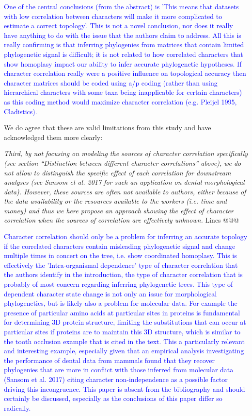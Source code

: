 \documentclass[12pt,letterpaper]{article}
\begin{document}
\textcolor{blue}{One of the central conclusions (from the abstract) is 'This means that datasets with low correlation between characters will make it more complicated to estimate a correct topology'. This is not a novel conclusion, nor does it really have anything to do with the issue that the authors claim to address. All this is really confirming is that inferring phylogenies from matrices that contain limited phylogenetic signal is difficult; it is not related to how correlated characters that show homoplasy impact our ability to infer accurate phylogenetic hypotheses. If character correlation really were a positive influence on topological accuracy then character matrices should be coded using a/p coding (rather than using hierarchical characters with some taxa being inapplicable for certain characters) as this coding method would maximize character correlation (e.g. Pleijel 1995, Cladistics).}


We do agree that these are valid limitations from this study and have acknowledged them more clearly:

\textit{Third, by not focusing on modeling the sources of character correlation specifically (see section “Distinction between different character correlations” above), we do not allow to distinguish the specific effect of each correlation for downstream analyses (see Sansom et al. 2017 for such an application on dental morphological data). However, these sources are often not available to authors, either because of the data availability or the resources available to the workers (i.e. time and money) and thus we here propose an approach showing the effect of character correlation when the sources of correlation are effectively unknown.} Lines @@@



\textcolor{blue}{Character correlation should only be a problem for inferring an accurate topology if the correlated characters contain misleading phylogenetic signal and change multiple times in concert on the tree, i.e. show coordinated homoplasy.  This is effectively the 'Intra-organismal dependence' type of character correlation that the authors identify in the introduction, the type of character correlation that is probably of most concern regarding inferring phylogenetic trees. This type of dependent character state change is not only an issue for morphological phylogenetics, but is likely also a problem for molecular data. For example the presence of particular amino acids at particular sites in proteins is fundamental for determining 3D protein structure, limiting the substitutions that can occur at particular sites if proteins are to maintain this 3D structure, which is similar to the tooth occlusion example that is cited in the text. This a particularly relevant and interesting example, especially given that an empirical analysis investigating the performance of dental data from mammals found that they recover phylogenies that are more in conflict with those inferred from molecular data (Sansom et al. 2017) citing character non-independence as a possible factor driving this incongruence. This paper is absent from the bibliography and should certainly be discussed, especially as the conclusions of this paper differ so radically.}
\end{document}
